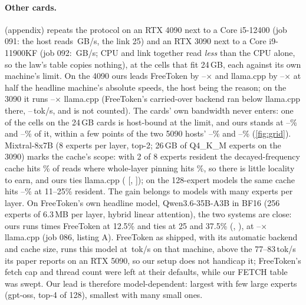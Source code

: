 \documentclass[10pt,twocolumn]{article}
\begin{document}
\paragraph{Other cards.}  (appendix) repeats the protocol on an RTX 4090 next to a Core i5-12400 (job
091: the host reads \grFourkHostBw\,GB/s, the link 25) and an RTX 3090 next to a Core i9-11900KF (job 092:
\grThreekHostBw\,GB/s; CPU and link together read \emph{less} than the CPU alone, so the law's table copies nothing),
at the cells that fit 24\,GB, each against its own machine's limit. On the 4090 ours leads FreeToken by
\grFourkFtMin--\grFourkFtMax$\times$ and llama.cpp by \grFourkLlamaMin--\grFourkLlamaMax$\times$ at half the
headline machine's absolute speeds, the host being the reason; on the 3090 it runs \grThreekLlamaMin--\grThreekLlamaMax$\times$
llama.cpp (FreeToken's carried-over backend ran below llama.cpp there, \grThreekFtSpeedMin--\grThreekFtSpeedMax\,tok/s,
and is not counted). The cards' own bandwidth never enters: \grSmallHostBound{} one of the \grSmallCellsN{} cells on
the 24\,GB cards is host-bound at the limit, and ours stands at
\grFourkFracMin--\grFourkFracMax\% and \grThreekFracMin--\grThreekFracMax\% of it, within a few points of the two
5090 hosts' \scLimFracBMin--\scLimFracBMax\% and \scLimFracMin--\scLimFracMax\% (\cref{fig:grid}). Mixtral-8x7B (8 experts per layer, top-2; 26\,GB of Q4\_K\_M experts on the 3090) marks the
cache's scope: with 2 of 8 experts resident the decayed-frequency cache hits \grMixHitCTwo\% of reads where whole-layer
pinning hits \grMixPinCTwo\%, so there is little locality to earn, and ours ties llama.cpp
(\grMixCTwo{} [\grMixCTwoLo, \grMixCTwoHi]); on the 128-expert models the same cache hits \grHitMin--\grHitMax\% at
11--25\% resident. The gain belongs to models with many experts per layer. On FreeToken's own headline model,
Qwen3.6-35B-A3B in BF16 (256 experts of 6.3\,MB per layer, hybrid linear attention), the two systems are close: ours runs
\qsixFtA{} times FreeToken at 12.5\% and ties at 25 and 37.5\% (\qsixFtB, \qsixFtC), at \qsixLlA--\qsixLlC$\times$ llama.cpp (job 086,
listing A). FreeToken as shipped, with its automatic backend and cache size, runs this model at \qsixAuto\,tok/s on that
machine, above the 77--83\,tok/s its paper reports on an RTX 5090, so our setup does not handicap it; FreeToken's
fetch cap and thread count were left at their defaults, while our FETCH table was swept. Our lead is therefore
model-dependent: largest with few large experts (gpt-oss, top-4 of 128), smallest with many small ones.
\end{document}

